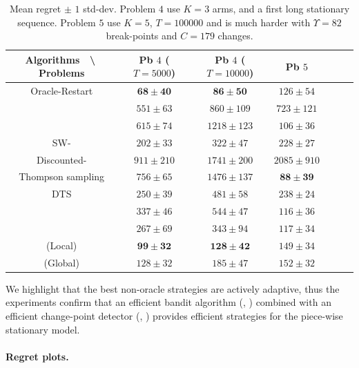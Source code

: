 \begin{table}[ht]
    \centering
    \begin{tabular}{c|cccccc}
        \textbf{Algorithms} $\;$ \textbackslash $\;$ \textbf{Problems} & Pb $4$ ($T=5000$) & Pb $4$ ($T=10000$) & Pb $5$ \\
        \hline
        Oracle-Restart \klUCB{} & $\mathbf{68 \pm 40}$ & $\mathbf{86 \pm 50}$ & $126 \pm 54$ \\
        \hline
        \ExpThreeS{} & $551 \pm 63$ & $860 \pm 109$ & $723 \pm 121$ \\
        \hline
        \klUCB{} & $615 \pm 74$ & $1218 \pm 123$ & $106 \pm 36$ \\
        SW-\klUCB{} & $202 \pm 33$ & $322 \pm 47$ & $228 \pm 27$ \\
        Discounted-\klUCB{} & $911 \pm 210$ & $1741 \pm 200$ & $2085 \pm 910$ \\
        \hline
        Thompson sampling & $756 \pm 65$ & $1476 \pm 137$ & $\mathbf{88 \pm 39}$ \\
        DTS & $250 \pm 39$ & $481 \pm 58$ & $238 \pm 24$ \\
        \hline
        \MklUCB{} & $337 \pm 46$ & $544 \pm 47$ & $116 \pm 36$ \\
        \CUSUMklUCB{} & $267 \pm 69$ & $343 \pm 94$ & $117 \pm 34$ \\
        \hline
        \GLRklUCB{}(Local) & $\mathbf{99 \pm 32}$ & $\mathbf{128 \pm 42}$ & $149 \pm 34$ \\
        \GLRklUCB{}(Global) & $128 \pm 32$ & $185 \pm 47$ & $152 \pm 32$
    \end{tabular}
    \caption{Mean regret $\pm$ $1$ std-dev. Problem $4$ use $K=3$ arms, and a first long stationary sequence. Problem $5$ use $K=5$, $T=100000$ and is much harder with $\Upsilon=82$ break-points and $C=179$ changes.}
    \label{table:6:totalResults2}
\end{table}

We highlight that the best non-oracle strategies are actively adaptive,
thus the experiments confirm that an efficient bandit algorithm (\eg, \klUCB) combined with an efficient change-point detector (\eg, \GLR) provides efficient strategies for the piece-wise stationary model.


\paragraph{Regret plots.}
\label{subsub:6:regretPlots}

